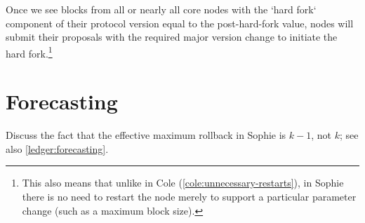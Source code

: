 Once we see blocks from all or nearly all core nodes with the `hard fork`
component of their protocol version equal to the post-hard-fork value, nodes
will submit their proposals with the required major version change to initiate
the hard fork.\footnote{This also means that unlike in Cole
(\cref{cole:unnecessary-restarts}), in Sophie there is no need to restart the
node merely to support a particular parameter change (such as a maximum block
size).}

\section{Forecasting}
\label{sophie:forecasting}

Discuss the fact that the effective maximum rollback in Sophie is $k - 1$,
not $k$; see also \cref{ledger:forecasting}.
